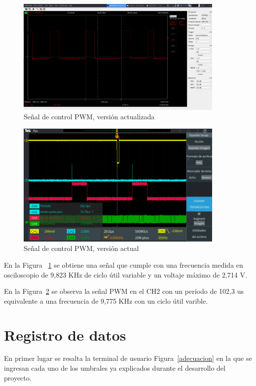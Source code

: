 \begin{figure}[H]
\includegraphics[width=0.9\textwidth]{Figs/PWM 2.jpeg} 
\centering
\caption{Señal de control PWM, versión actualizada}
\label{pwmactual}
\end{figure}
\begin{figure}[H]

\includegraphics[width=0.9\textwidth]{Figs/TEK00019.PNG} 
\centering
\caption{Señal de control PWM, versión actual}
\label{pwmantigua}
\end{figure}


En la Figura ~\ref{pwmactual} se obtiene una señal que cumple con una frecuencia medida en osciloscopio de 9,823 KHz de ciclo útil variable y un voltaje máximo de 2,714 V.

En la Figura~\ref{pwmantigua} se observa la señal PWM en el CH2 con un período de 102,3 us equivalente a una frecuencia de 9,775 KHz con un ciclo útil varible.


\section{\textbf{Registro de datos}}
En primer lugar se resalta la terminal de usuario Figura~\ref{adecuacion} en la que se ingresan cada uno de los umbrales ya explicados durante el desarrollo del proyecto.

